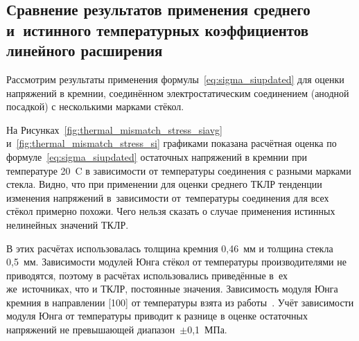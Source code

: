\subsection{Сравнение результатов применения среднего и~истинного температурных коэффициентов линейного расширения}
Рассмотрим результаты применения формулы~\eqref{eq:sigma_siupdated} для оценки напряжений в кремнии, соединённом электростатическим соединением (анодной посадкой) с несколькими марками стёкол.

На Рисунках~\ref{fig:thermal_mismatch_stress_siavg} и~\ref{fig:thermal_mismatch_stress_si} графиками показана расчётная оценка по формуле~\eqref{eq:sigma_siupdated} остаточных напряжений в кремнии при температуре 20~{\textdegree}C в зависимости от температуры соединения с разными марками стекла. Видно, что при применении для оценки среднего ТКЛР тенденции изменения напряжений в~зависимости от~температуры соединения для всех стёкол примерно похожи. Чего нельзя сказать о случае применения истинных нелинейных значений ТКЛР.

В этих расчётах использовалась толщина кремния 0,46~мм и толщина стекла 0,5~мм.
Зависимости модулей Юнга стёкол от температуры производителями не приводятся, поэтому в расчётах использовались приведённые
в~ех же~источниках, что и ТКЛР, постоянные значения. %
Зависимость модуля Юнга кремния в направлении [100] от температуры взята из работы~\cite{swarnakar2014determination}. Учёт зависимости модуля Юнга от температуры приводит к разнице в оценке остаточных напряжений не превышающей диапазон~${\pm}$0,1~МПа.


